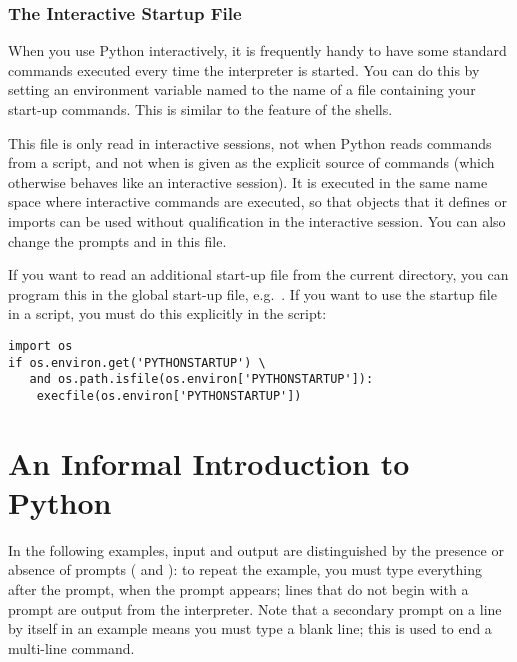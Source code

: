 \documentclass{manual}
\begin{document}
\subsection{The Interactive Startup File \label{startup}}


When you use Python interactively, it is frequently handy to have some
standard commands executed every time the interpreter is started.  You
can do this by setting an environment variable named
 to the name of a file containing your start-up
commands.  This is similar to the  feature of the \UNIX{}
shells.

This file is only read in interactive sessions, not when Python reads
commands from a script, and not when  is given as the
explicit source of commands (which otherwise behaves like an
interactive session).  It is executed in the same name space where
interactive commands are executed, so that objects that it defines or
imports can be used without qualification in the interactive session.
You can also change the prompts  and  in
this file.

If you want to read an additional start-up file from the current
directory, you can program this in the global start-up file,
e.g.\ .  If
you want to use the startup file in a script, you must do this
explicitly in the script:

\begin{verbatim}
import os
if os.environ.get('PYTHONSTARTUP') \
   and os.path.isfile(os.environ['PYTHONSTARTUP']):
    execfile(os.environ['PYTHONSTARTUP'])
\end{verbatim}


\chapter{An Informal Introduction to Python \label{informal}}

In the following examples, input and output are distinguished by the
presence or absence of prompts (\samp{>>> } and \samp{... }): to repeat
the example, you must type everything after the prompt, when the
prompt appears; lines that do not begin with a prompt are output from
the interpreter.%
Note that a secondary prompt on a line by itself in an example means
you must type a blank line; this is used to end a multi-line command.
\end{document}
